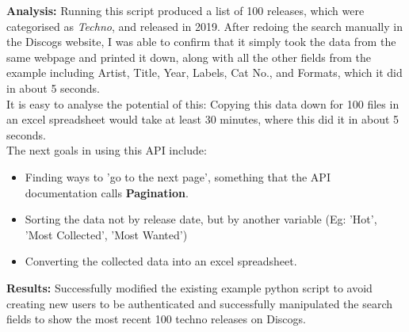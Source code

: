 \documentclass{article}
\begin{document}
\textbf{Analysis:} Running this script produced a list of 100 releases, which were categorised as \textit{Techno}, and released in 2019. After redoing the search manually in the Discogs website, I was able to confirm that it simply took the data from the same webpage and printed it down, along with all the other fields from the example including Artist, Title, Year, Labels, Cat No., and Formats, which it did in about 5 seconds.\\
It is easy to analyse the potential of this: Copying this data down for 100 files in an excel spreadsheet would take at least 30 minutes, where this did it in about 5 seconds.\\
The next goals in using this API include:
\begin{itemize}
    \item Finding ways to 'go to the next page', something that the API documentation calls \textbf{Pagination}.
    \item Sorting the data not by release date, but by another variable (Eg: 'Hot', 'Most Collected', 'Most Wanted')
    \item Converting the collected data into an excel spreadsheet.
\end{itemize}
\textbf{Results:} Successfully modified the existing example python script to avoid creating new users to be authenticated and successfully manipulated the search fields to show the most recent 100 techno releases on Discogs.
\end{document}
